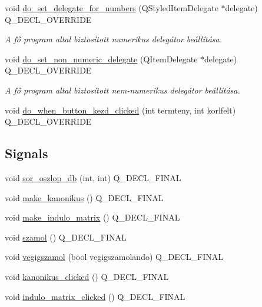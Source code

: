 \begin{DoxyCompactItemize}
\item 
void \hyperlink{classMainvindow__gui__plugin_aaf24d376b70a136b52e8dae5dfc3ad15}{do\+\_\+set\+\_\+delegate\+\_\+for\+\_\+numbers} (Q\+Styled\+Item\+Delegate $\ast$delegate) Q\+\_\+\+D\+E\+C\+L\+\_\+\+O\+V\+E\+R\+R\+I\+DE
\begin{DoxyCompactList}\small\item\em A fő program altal biztosított numerikus delegátor beállítása. \end{DoxyCompactList}\item 
void \hyperlink{classMainvindow__gui__plugin_a7f8f250d9d8b2adc3ee04b768f9b3ee8}{do\+\_\+set\+\_\+non\+\_\+numeric\+\_\+delegate} (Q\+Item\+Delegate $\ast$delegate) Q\+\_\+\+D\+E\+C\+L\+\_\+\+O\+V\+E\+R\+R\+I\+DE
\begin{DoxyCompactList}\small\item\em A fő program altal biztosított nem-\/numerikus delegátor beállítása. \end{DoxyCompactList}\item 
void \hyperlink{classMainvindow__gui__plugin_a8134d2856b60ba95754aa899c39bbabe}{do\+\_\+when\+\_\+button\+\_\+kezd\+\_\+clicked} (int termteny, int korlfelt) Q\+\_\+\+D\+E\+C\+L\+\_\+\+O\+V\+E\+R\+R\+I\+DE
\end{DoxyCompactItemize}
\subsection*{Signals}
\begin{DoxyCompactItemize}
\item 
void \hyperlink{classMainvindow__gui__plugin_adb6c0d468163f8192f2138b15a6c43e9}{sor\+\_\+oszlop\+\_\+db} (int, int) Q\+\_\+\+D\+E\+C\+L\+\_\+\+F\+I\+N\+AL
\item 
void \hyperlink{classMainvindow__gui__plugin_ab72edb0176103371d01ede7a001746a4}{make\+\_\+kanonikus} () Q\+\_\+\+D\+E\+C\+L\+\_\+\+F\+I\+N\+AL
\item 
void \hyperlink{classMainvindow__gui__plugin_ae1b472871fd6e98296a968a1f6dee653}{make\+\_\+indulo\+\_\+matrix} () Q\+\_\+\+D\+E\+C\+L\+\_\+\+F\+I\+N\+AL
\item 
void \hyperlink{classMainvindow__gui__plugin_ae7b7382ef0b52b1116426d3fc9c78caa}{szamol} () Q\+\_\+\+D\+E\+C\+L\+\_\+\+F\+I\+N\+AL
\item 
void \hyperlink{classMainvindow__gui__plugin_a2fe7a4a60ee4e4f61579ccc717e8258d}{vegigszamol} (bool vegigszamolando) Q\+\_\+\+D\+E\+C\+L\+\_\+\+F\+I\+N\+AL
\item 
void \hyperlink{classMainvindow__gui__plugin_aacc5de871594914c5d4c8edcec6576a8}{kanonikus\+\_\+clicked} () Q\+\_\+\+D\+E\+C\+L\+\_\+\+F\+I\+N\+AL
\item 
void \hyperlink{classMainvindow__gui__plugin_a9f1289a2d061b153834961a41e442a35}{indulo\+\_\+matrix\+\_\+clicked} () Q\+\_\+\+D\+E\+C\+L\+\_\+\+F\+I\+N\+AL
\end{DoxyCompactItemize}
